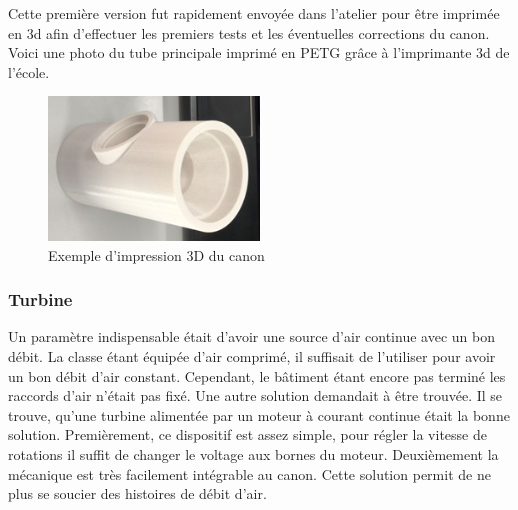 Cette première version fut rapidement envoyée dans l’atelier pour être imprimée en 3d afin d’effectuer 
les premiers tests et les éventuelles corrections du canon. Voici une photo du tube principale imprimé 
en PETG grâce à l’imprimante 3d de l’école.

\begin{figure}[H]
    \centering
    \includegraphics[width=0.5\textwidth]{Images/photos_PGA/CanonBloc.jpg}
    \caption{Exemple d'impression 3D du canon}
    \label{fig:3DPrintCanon}
\end{figure}

\subsubsection{Turbine}

Un paramètre indispensable était d’avoir une source d’air continue avec un bon débit. La classe étant 
équipée d’air comprimé, il suffisait de l’utiliser pour avoir un bon débit d’air constant. Cependant, 
le bâtiment étant encore pas terminé les raccords d’air n’était pas fixé. Une autre solution demandait 
à être trouvée. Il se trouve, qu’une turbine alimentée par un moteur à courant continue était la bonne 
solution. Premièrement, ce dispositif est assez simple, pour régler la vitesse de rotations il suffit 
de changer le voltage aux bornes du moteur. Deuxièmement la mécanique est très facilement intégrable 
au canon. Cette solution permit de ne plus se soucier des histoires de débit d’air.

